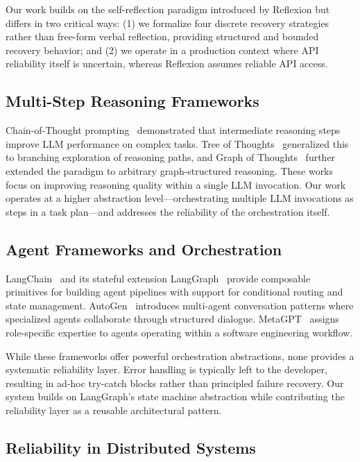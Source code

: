 \documentclass[conference]{IEEEtran}
\begin{document}
Our work builds on the self-reflection paradigm introduced by Reflexion but differs in two critical ways: (1) we formalize four discrete recovery strategies rather than free-form verbal reflection, providing structured and bounded recovery behavior; and (2) we operate in a production context where API reliability itself is uncertain, whereas Reflexion assumes reliable API access.

\subsection{Multi-Step Reasoning Frameworks}

Chain-of-Thought prompting~\cite{wei2022chain} demonstrated that intermediate reasoning steps improve LLM performance on complex tasks. Tree of Thoughts~\cite{yao2023tree} generalized this to branching exploration of reasoning paths, and Graph of Thoughts~\cite{besta2024graph} further extended the paradigm to arbitrary graph-structured reasoning. These works focus on improving reasoning quality within a single LLM invocation. Our work operates at a higher abstraction level---orchestrating multiple LLM invocations as steps in a task plan---and addresses the reliability of the orchestration itself.

\subsection{Agent Frameworks and Orchestration}

LangChain~\cite{chase2023langchain} and its stateful extension LangGraph~\cite{langgraph2024} provide composable primitives for building agent pipelines with support for conditional routing and state management. AutoGen~\cite{wu2023autogen} introduces multi-agent conversation patterns where specialized agents collaborate through structured dialogue. MetaGPT~\cite{hong2023metagpt} assigns role-specific expertise to agents operating within a software engineering workflow.

While these frameworks offer powerful orchestration abstractions, none provides a systematic reliability layer. Error handling is typically left to the developer, resulting in ad-hoc try-catch blocks rather than principled failure recovery. Our system builds on LangGraph's state machine abstraction while contributing the reliability layer as a reusable architectural pattern.

\subsection{Reliability in Distributed Systems}
\end{document}
